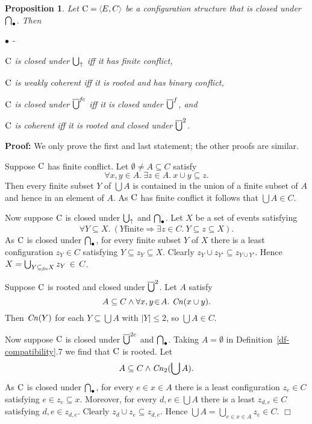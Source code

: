 \documentclass[twocolumn]{article}
\newtheorem{prop}{Proposition}[section]
\newenvironment{proposition}[1]{\begin{prop} \rm \label{pr-#1} }{\end{prop}}
\newenvironment{proof}{\begin{trivlist} \item[\hspace{\labelsep}\bf
Proof:]}{\hfill $\Box$\end{trivlist}}
\newcommand{\df}[1]{Definition~\ref{df-#1}}
\newenvironment{itemise}{\begin{list}{$\bullet$}{\leftmargin 18pt
                        \labelwidth\leftmargini\advance\labelwidth-\labelsep
                        \topsep 4pt \itemsep 2pt \parsep 2pt}}{\end{list}}
\begin{document}
\begin{proposition}{directed-unions} Let $\eC = \tuple{E,C}$ be a
configuration structure that is closed under $\bigcap_{\bullet}$. Then
\begin{itemise}
\item ${\rm C}$ is closed under $\bigcup_{\uparrow}$ iff it has finite conflict,
\item ${\rm C}$ is weakly coherent iff it is rooted and has binary conflict,
\item ${\rm C}$ is closed under $\overline{\bigcup}^{\it fc}$ iff it is closed
under $\overline{\bigcup}^f$, and
\item ${\rm C}$ is coherent iff it is rooted and closed under $\overline{\bigcup}^2$.
\end{itemise}
\end{proposition}

\begin{proof}
We only prove the first and last statement; the other proofs are similar.

Suppose ${\rm C}$ has finite conflict. Let $\emptyset\neq A \subseteq C$ satisfy
$$\forall x,y\!\in\! A.~\exists z\!\in\!A.~x\cup y \subseteq z.$$
Then every finite subset $Y$ of $\bigcup A$ is contained in the union
of a finite subset of $A$ and hence in an element of $A$.
As ${\rm C}$ has finite conflict it follows that $\bigcup A \in C$.

Now suppose ${\rm C}$ is closed under $\bigcup_{\uparrow}$ and $\bigcap_{\bullet}$.
Let $X$ be a set of events satisfying
$$\forall Y \!\!\subseteq\! X.~(Y \mbox{finite} \Rightarrow \exists
z\!\in\! C.~ Y \!\!\subseteq\! z\!\subseteq\! X).$$
As ${\rm C}$ is closed under $\bigcap_{\bullet}$, for every finite subset $Y$ of
$X$ there is a least configuration $z_Y \in C$ satisfying $Y\subseteq
z_Y\subseteq X$. Clearly $z_{Y} \cup z_{Y'}\subseteq z_{Y\cup Y'}$.
Hence $X=\bigcup_{Y \subseteq_{{\it fin}}X}z_Y \,  \in \, C$.

Suppose ${\rm C}$ is rooted and closed under $\overline{\bigcup}^2$. Let $A$ satisfy
$$A \subseteq C \wedge \forall x,y\!\in\!A.~{\it Cn}(x\cup y).$$
Then ${\it Cn}(Y)$ for each $Y \!\subseteq\! \bigcup A$ with $|Y|\!\leq\! 2$, so
$\bigcup A \!\in\! C$.

Now suppose ${\rm C}$ is closed under $\overline{\bigcup}^{2c}$ and $\bigcap_{\bullet}$.
Taking $A=\emptyset$ in \df{compatibility}.7 we find that ${\rm C}$ is rooted.
Let $$A \subseteq C \wedge {\it Cn}_2(\bigcup A).$$
As ${\rm C}$ is closed under $\bigcap_{\bullet}$, for every $e\!\in\!x\!\in\!A$
there is a least configuration $z_e \!\in\! C$ satisfying $e\in z_e
\subseteq x$. Moreover, for every $d,e\in\bigcup A$ there is a least
\mbox{$z_{d,e}\!\in C$} satisfying $d,e\in z_{d,e}$. Clearly $z_{d}
\cup z_{e}\subseteq z_{d,e}$.
Hence $\bigcup A = \bigcup_{e\in x \in A} z_e \in C$.
\end{proof}
\end{document}
